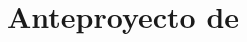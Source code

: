 \documentclass[11pt,a4paper,oneside]{article}
\title{Anteproyecto de \myWorkTypeFull}        %
\date{\myThesisProposalDate}                         %
\author{\myAuthorFullName}
\begin{document}

% 


% 

\maketitle

\begin{description}                               %
\item[\CapitalizeFirstLetter{\wordAutorOrAutora}:] \myAuthorFullName                       %
\item[\CapitalizeFirstLetter{\wordTutorOrTutores}:] \myAdvisors                   %
  \item[Titulación:] \myDegreefull                %
  \item[Título:] \myBookTitleSpanish              %
  \ifEnglish                                      %
  {                                               %
  \item[Título en inglés:] \myBookTitleEnglish    %
  }                                               %
  {                                               %
  }                                               %
\item[Departamento:] \myDepartment                %
\end{description}                                 %


\end{document}
